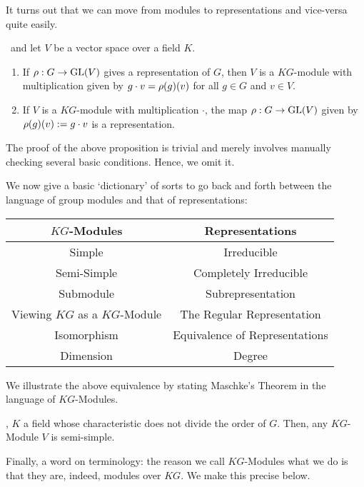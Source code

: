 It turns out that we can move from modules to representations and vice-versa quite easily.

\begin{proposition}
    \ and let $V$ be a vector space over a field $K$.
    \begin{enumerate}[label = \normalfont \arabic*.]
        \item If $\rho : G \to \operatorname{GL}\!\left( V \right)$ gives a representation of $G$, then $V$ is a $KG$-module with multiplication given by $g \cdot v = \rho\!\left( g \right)\!\left( v \right)$ for all $g \in G$ and $v \in V$.
        \item If $V$ is a $KG$-module with multiplication $\cdot$, the map $\rho : G \to \operatorname{GL}\!\left( V \right)$ given by $\rho\!\left( g \right)\!\left( v \right) := g \cdot v$ is a representation.
    \end{enumerate}
\end{proposition}

The proof of the above proposition is trivial and merely involves manually checking several basic conditions. Hence, we omit it.

We now give a basic `dictionary' of sorts to go back and forth between the language of group modules and that of representations:

\begin{table}[!h]
    \centering
    \begin{tabular}{c|c}
        \textbf{$KG$-Modules} & \textbf{Representations} \\ \hline
        Simple & Irreducible \\
        Semi-Simple & Completely Irreducible \\
        Submodule & Subrepresentation \\
        Viewing $KG$ as a $KG$-Module & The Regular Representation \\
        Isomorphism & Equivalence of Representations \\
        Dimension & Degree
    \end{tabular}
\end{table}

We illustrate the above equivalence by stating Maschke's Theorem in the language of $KG$-Modules.

\begin{lemma}
    , $K$ a field whose characteristic does not divide the order of $G$. Then, any $KG$-Module $V$ is semi-simple.
\end{lemma}

Finally, a word on terminology: the reason we call $KG$-Modules what we do is that they are, indeed, modules over $KG$. We make this precise below.

